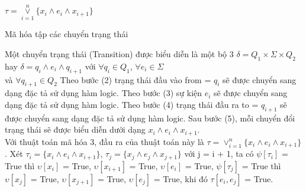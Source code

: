 \documentclass[a4paper,13pt,oneside,openany]{book}
\newenvironment{megaalgorithm}[1][htb]
{\renewcommand{\algorithmcfname}{Thuật toán}%
	\begin{algorithm}[#1]%
}{\end{algorithm}}
\begin{document}
\begin{flushleft}
\begin{megaalgorithm}[H]
			\Return $\tau = \overset{n}{\underset{i=1}{\lor}} \{x_i \land e_i \land x_{i+1}\}$
				
			\caption{Mã hóa tập các chuyển trạng thái}
		\end{megaalgorithm}
		Một chuyển trạng thái (Transition) được biểu diễn là một bộ 3 $\delta = Q_{1} \times \Sigma \times Q_{2}$ hay $\delta = q_{i} \land e_i \land q_{i+1}$ với $\forall q_{i} \in Q_{1}$, $\forall e_{i} \in \Sigma$\\ và $\forall q_{i+1} \in Q_{2}$
		Theo bước (2) trạng thái đầu vào from = $q_{i}$ sẽ được chuyển sang dạng đặc tả sử dụng hàm logic. Theo bước (3) sự kiện $e_i$ sẽ được chuyển sang dạng đặc tả sử dụng hàm logic. Theo bước (4) trạng thái đầu ra to = $q_{i+1}$ sẽ được chuyển sang dạng đặc tả sử dụng hàm logic. Sau bước (5), mỗi chuyển đổi trạng thái sẽ được biểu diễn dưới dạng $x_{i} \land e_i \land x_{i+1}$.\\
		
		Với thuật toán mã hóa 3, đầu ra của thuật toán này là $\tau = \lor_{i=1}^n \{x_i \land e_i \land x_{i+1}\}$. Xét $\tau_i = \{x_i \land e_i \land x_{i+1}\}$, $\tau_j = \{x_j \land e_j \land x_{j+1}\}$ với j = i + 1, ta có $\psi [\tau_i]$ = True thì $\upsilon[x_i]$ = True, $\upsilon[x_{i+1}]$ = True, $\upsilon[e_i]$ = True, $\psi [\tau_j]$ = True thì $\upsilon[x_j]$ = True, $\upsilon[x_{j+1}]$ = True, $\upsilon[e_j]$ = True, khi đó $\tau [e_i, e_j]$ = True.

\end{flushleft}
\end{document}
